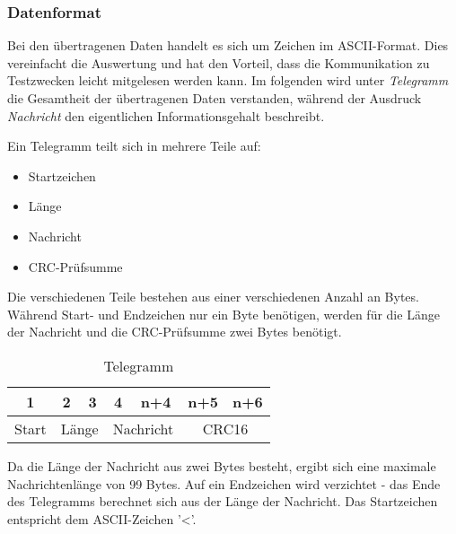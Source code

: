 \newpage

\subsubsection{Datenformat}

Bei den übertragenen Daten handelt es sich um Zeichen im \acs{ASCII}-Format. Dies vereinfacht die Auswertung und hat den Vorteil, dass die Kommunikation
zu Testzwecken leicht mitgelesen werden kann. Im folgenden wird unter \textit{Telegramm} die Gesamtheit der übertragenen Daten verstanden, während 
der Ausdruck \textit{Nachricht} den eigentlichen Informationsgehalt beschreibt.

\smallskip

Ein Telegramm teilt sich in mehrere Teile auf:

\begin{itemize}
    \item Startzeichen
    \item Länge
    \item Nachricht
    \item CRC-Prüfsumme
\end{itemize}



Die verschiedenen Teile bestehen aus einer verschiedenen Anzahl an Bytes. Während Start- und Endzeichen nur ein Byte benötigen, werden für die
Länge der Nachricht und die CRC-Prüfsumme zwei Bytes benötigt.

\smallskip

\begin{wraptable}{r}{75mm} 
    
    \begin{tabular}{ |c | c | c | c | c | c | c | }
        \hline
        1 & 2 & 3 & 4 & n+4 & n+5 & n+6  \\
        \hline \hline
        Start  & \multicolumn{2}{|c|}{Länge} & \multicolumn{2}{|c|}{Nachricht} & \multicolumn{2}{|c|}{CRC16} \\
        \hline
    
      \end{tabular}
    \centering
    \caption{Telegramm}
    \end{wraptable}


Da die Länge der Nachricht aus zwei Bytes besteht, ergibt sich eine maximale Nachrichtenlänge von 99 Bytes. Auf ein Endzeichen wird verzichtet - 
das Ende des Telegramms berechnet sich aus der Länge der Nachricht. Das Startzeichen entspricht dem \acs{ASCII}-Zeichen '<'.

